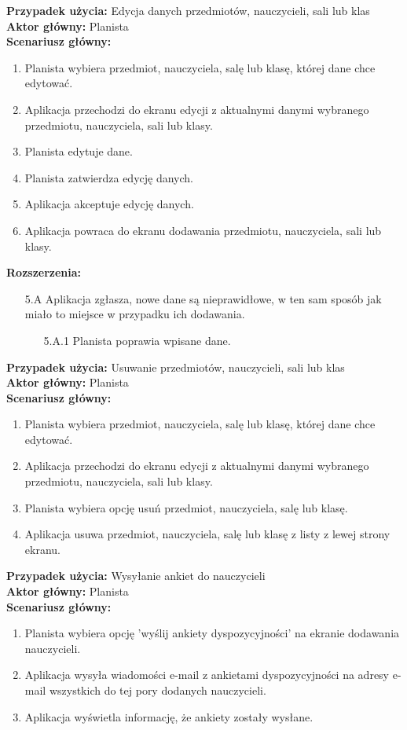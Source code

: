 \noindent
\textbf{Przypadek użycia:} Edycja danych przedmiotów, nauczycieli, sali lub klas\\
\textbf{Aktor główny:} Planista\\
\textbf{Scenariusz główny:}
\begin{enumerate}
	\item Planista wybiera przedmiot, nauczyciela, salę lub klasę, której dane chce edytować.
	\item Aplikacja przechodzi do ekranu edycji z aktualnymi danymi wybranego przedmiotu, nauczyciela, sali lub klasy.
	\item Planista edytuje dane.
	\item Planista zatwierdza edycję danych.
	\item Aplikacja akceptuje edycję danych.
	\item Aplikacja powraca do ekranu dodawania przedmiotu, nauczyciela, sali lub klasy.
\end{enumerate}
\textbf{Rozszerzenia:}
	\begin{enumerate}
         \item[5.A] Aplikacja zgłasza, nowe dane są nieprawidłowe, w ten sam sposób jak miało to miejsce w przypadku ich dodawania.
         \begin{enumerate}
         	\item[5.A.1] Planista poprawia wpisane dane.
         \end{enumerate}
	\end{enumerate}
	
\noindent
\textbf{Przypadek użycia:} Usuwanie przedmiotów, nauczycieli, sali lub klas\\
\textbf{Aktor główny:} Planista\\
\textbf{Scenariusz główny:}
\begin{enumerate}
	\item Planista wybiera przedmiot, nauczyciela, salę lub klasę, której dane chce edytować.
	\item Aplikacja przechodzi do ekranu edycji z aktualnymi danymi wybranego przedmiotu, nauczyciela, sali lub klasy.
	\item Planista wybiera opcję usuń przedmiot, nauczyciela, salę lub klasę.
	\item Aplikacja usuwa przedmiot, nauczyciela, salę lub klasę z listy z lewej strony ekranu.
\end{enumerate}

\noindent
\textbf{Przypadek użycia:} Wysyłanie ankiet do nauczycieli\\
\textbf{Aktor główny:} Planista\\
\textbf{Scenariusz główny:}
\begin{enumerate}
	\item Planista wybiera opcję 'wyślij ankiety dyspozycyjności' na ekranie dodawania nauczycieli.
	\item Aplikacja wysyła wiadomości e-mail z ankietami dyspozycyjności na adresy e-mail wszystkich do tej pory dodanych nauczycieli.
	\item Aplikacja wyświetla informację, że ankiety zostały wysłane.
\end{enumerate}

